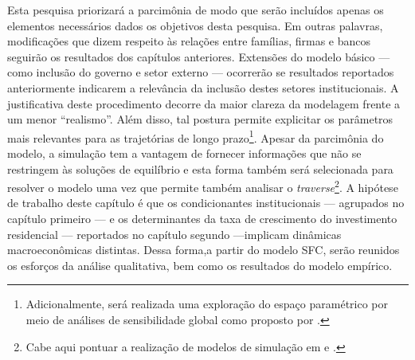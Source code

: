 Esta pesquisa priorizará a parcimônia de modo que serão incluídos apenas os elementos necessários dados os objetivos desta pesquisa.
Em outras palavras, modificações que dizem respeito às relações entre famílias, firmas e bancos seguirão os resultados dos capítulos anteriores.
Extensões do modelo básico --- como inclusão do governo e setor externo --- ocorrerão se resultados reportados anteriormente indicarem a relevância da inclusão destes setores institucionais.
A justificativa deste procedimento decorre da maior clareza
da modelagem frente a um menor ``realismo''. Além disso, tal postura permite explicitar os parâmetros mais relevantes para as
trajetórias de longo prazo\footnote{
	Adicionalmente, será realizada uma exploração do espaço paramétrico por meio de análises de sensibilidade global como proposto por \textcite{saltelli_variance_2010}.
}. Apesar da parcimônia do modelo, a simulação tem a vantagem de fornecer
informações que não se restringem às soluções de equilíbrio e esta forma também será selecionada
para resolver o modelo uma vez que permite também analisar o \textit{traverse}\footnote{Cabe aqui pontuar a realização de modelos de simulação em \textcite{da_silveira_investimento_2019} e \textcite{petrini_demanda_2019}.}. 
A hipótese de trabalho deste capítulo é que os condicionantes institucionais --- agrupados no capítulo primeiro --- e os determinantes da taxa de crescimento do investimento residencial --- reportados no capítulo segundo ---implicam dinâmicas macroeconômicas distintas.
Dessa forma,a partir do modelo SFC, serão reunidos os esforços da análise qualitativa, bem como os resultados do modelo empírico.


\begin{comment}

Mais especificamente, uma condição é considerada suficiente quando o números de um condicionantes de um resultado supera o número de casos que apresentam este resultado. Um condição necessária é caracterizada pelo oposto, ou seja, existem mais casos que apresentam este resultado do que condições.
\end{comment}
